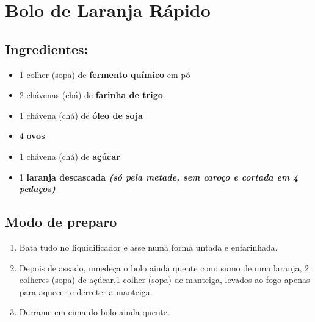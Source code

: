 \documentclass{report}
\begin{document}
\section{Bolo de Laranja Rápido}

\subsection{Ingredientes:}

\begin{itemize}
\item 1 colher (sopa) de \textbf{fermento químico} em pó

\item 2 chávenas (chá) de \textbf{farinha de trigo}

\item 1 chávena (chá) de \textbf{óleo de soja}

\item 4 \textbf{ovos}

\item 1 chávena (chá) de \textbf{açúcar}

\item 1 \textbf{laranja descascada \textit{(só pela metade, sem caroço e cortada em 4 pedaços)}}
\end{itemize}


\subsection{Modo de preparo}

\begin{enumerate}
\item Bata tudo no liquidificador e asse numa forma untada e enfarinhada.

\item Depois de assado, umedeça o bolo ainda quente com: sumo de uma laranja, 2 colheres (sopa) de açúcar,1 colher (sopa) de manteiga, levados ao fogo apenas para aquecer e derreter a manteiga.

\item Derrame em cima do bolo ainda quente.
\end{enumerate}
\end{document}
